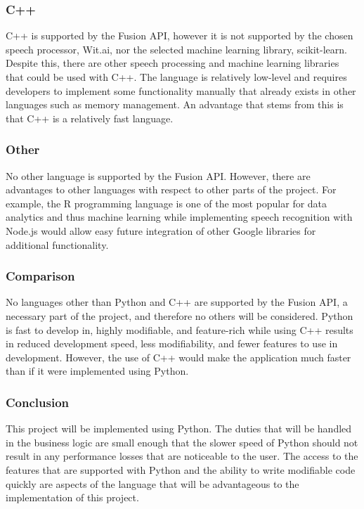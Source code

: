 \documentclass[onecolumn, draftclsnofoot,10pt, compsoc]{IEEEtran}
\begin{document}
	\subsubsection{C++}
	C++ is supported by the Fusion API, however it is not supported by the chosen speech processor, Wit.ai, nor the selected machine learning library, scikit-learn.
	Despite this, there are other speech processing and machine learning libraries that could be used with C++.
	The language is relatively low-level and requires developers to implement some functionality manually that already exists in other languages such as memory management.
	An advantage that stems from this is that C++ is a relatively fast language\cite{PyCppSpeedBenchmarks}.
	\subsubsection{Other}
	No other language is supported by the Fusion API.
	However, there are advantages to other languages with respect to other parts of the project.
	For example, the R programming language is one of the most popular for data analytics and thus machine learning\cite{MLLang} while implementing speech recognition with Node.js would allow easy future integration of other Google libraries for additional functionality.

	\subsubsection{Comparison}
	No languages other than Python and C++ are supported by the Fusion API\cite{AutodeskCreateScript}, a necessary part of the project, and therefore no others will be considered.
	Python is fast to develop in, highly modifiable, and feature-rich while using C++ results in reduced development speed, less modifiability, and fewer features to use in development.
	However, the use of C++ would make the application much faster than if it were implemented using Python.

	\subsubsection{Conclusion}
	This project will be implemented using Python.
	The duties that will be handled in the business logic are small enough that the slower speed of Python should not result in any performance losses that are noticeable to the user.
	The access to the features that are supported with Python and the ability to write modifiable code quickly are aspects of the language that will be advantageous to the implementation of this project.
\end{document}
